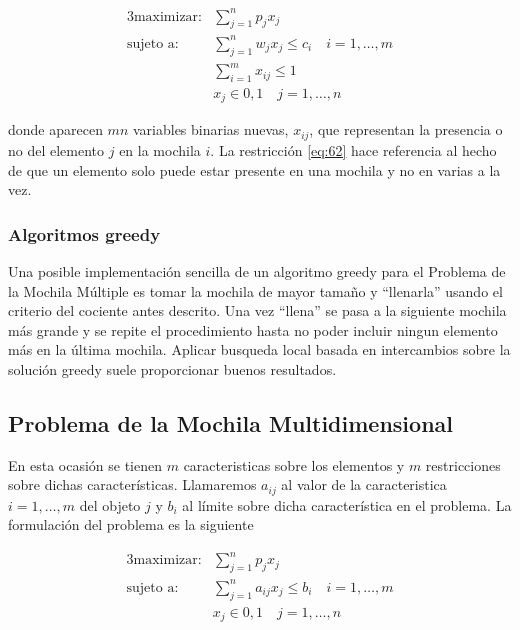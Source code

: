 \begin{alignat}{3}
    \text{maximizar:}   &   \sum_{j=1}^n p_jx_j                             \\
    \text{sujeto a:}    &   \sum_{j=1}^n w_jx_j\leq c_i \quad i=1,\dots,m   \\
                        &   \sum_{i=1}^m x_{ij}\leq 1 \label{eq:62}           \\
                        &   x_j \in {0, 1} \quad j=1,\dots,n
\end{alignat}

\noindent donde aparecen $mn$ variables binarias nuevas, $x_{ij}$, que representan la presencia o no del elemento $j$ en la 
mochila $i$. La restricción \ref{eq:62} hace referencia al hecho de que un elemento solo puede estar presente en una mochila
y no en varias a la vez.

\subsubsection{Algoritmos greedy}

Una posible implementación sencilla de un algoritmo greedy para el Problema de la Mochila Múltiple es tomar la mochila de
mayor tamaño y ``llenarla'' usando el criterio del cociente antes descrito. Una vez ``llena'' se pasa a la siguiente mochila
más grande y se repite el procedimiento hasta no poder incluir ningun elemento más en la última mochila. Aplicar busqueda 
local basada en intercambios sobre la solución greedy suele proporcionar buenos resultados.

\subsection{Problema de la Mochila Multidimensional}

En esta ocasión se tienen $m$ caracteristicas sobre los elementos y $m$ restricciones sobre dichas características. Llamaremos
$a_{ij}$ al valor de la caracteristica $i=1,\dots,m$ del objeto $j$ y $b_i$ al límite sobre dicha característica en el
problema. La formulación del problema es la siguiente

\begin{alignat}{3}
    \text{maximizar:}   &   \sum_{j=1}^n p_jx_j                                 \\
    \text{sujeto a:}    &   \sum_{j=1}^n a_{ij}x_j\leq b_i \quad i=1,\dots,m    \\
                        &   x_j \in {0, 1} \quad j=1,\dots,n
\end{alignat}

